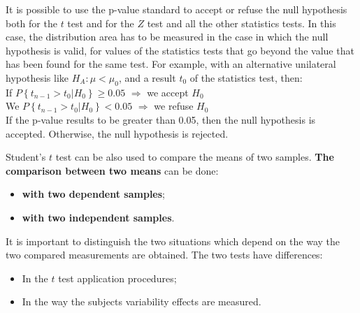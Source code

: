 \begin{frame}
  \vspace*{.25cm}
  It is possible to use the p-value standard to accept or refuse the null hypothesis both for the $ t $ test and for the $ Z $ test and all the other statistics tests. 
  In this case, the distribution area has to be measured in the case in which the null hypothesis is valid, for values of the statistics tests that go beyond the value that has been found for the same test. For example, with an alternative unilateral hypothesis like $ H_A: \mu < \mu_0 $, and a result $ t_0 $ of the statistics test, then:\\
  \vspace*{.5cm}
  If $ P \left\{ t_{n-1} > t_0 \lvert H_0 \right\} \geq 0.05 $ $ \Rightarrow $ we accept $ H_0 $\\
  \vspace*{.5cm}
  We $ P \left\{ t_{n-1} > t_0 \lvert H_0 \right\} < 0.05 $ $ \Rightarrow $ we refuse $ H_0 $\\
  \vspace*{.5cm}
  If the p-value results to be greater than 0.05, then the null hypothesis is accepted. Otherwise, the null hypothesis is rejected.
\end{frame}


\begin{frame}
  \vspace*{.25cm}
  Student's $ t $ test can be also used to compare the means of two samples. \textbf{The comparison between two means} can be done:
  \begin{itemize}
    \item \textbf{with two dependent samples};
    \item \textbf{with two independent samples}.
  \end{itemize}
  \vspace*{.5cm}
  It is important to distinguish the two situations which depend on the way the two compared measurements are obtained.
  The two tests have differences:
  \begin{itemize}
    \item In the $ t $ test application procedures;
    \item In the way the subjects variability effects are measured.
  \end{itemize}
\end{frame}

